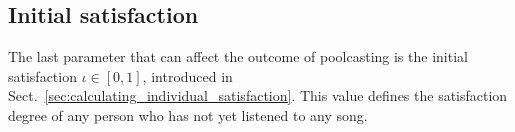 % 
% 
% 
% 
% 
% 
% 
% 
% 
% 
% 


\subsection{Initial satisfaction} %
\label{sub:initial_satisfaction}

The last parameter that can affect the outcome of poolcasting is the initial satisfaction $\iota \in [0,1]$, introduced in Sect.~\ref{sec:calculating_individual_satisfaction}.
This value defines the satisfaction degree of any person who has not yet listened to any song.

